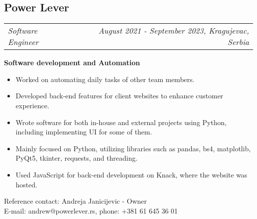\documentclass[11pt,a4paper]{moderncv}
\newcommand*{\experienceentry}[5][1.5mm]{
    \subsection{#2} \vspace{-1.5mm}
    \begin{tabularx}{\textwidth}{LR}
        {\itshape #3} & {\itshape #4, #5}
    \end{tabularx}
    \par\addvspace{#1}
}
\begin{document}
\begin{minipage}[t]{0.62\textwidth}
    \vspace{1.0mm}
    
    \experienceentry{Power Lever}{Software Engineer}{August 2021 - September 2023}{Kragujevac, Serbia}

    \textbf{Software development and Automation}
    \begin{itemize}
        \item Worked on automating daily tasks of other team members.
        \item Developed back-end features for client websites to enhance customer experience.
        \item Wrote software for both in-house and external projects using Python, including implementing UI for some of them.
        \item Mainly focused on Python, utilizing libraries such as pandas, bs4, matplotlib, PyQt5, tkinter, requests, and threading.
        \item Used JavaScript for back-end development on Knack, where the website was hosted.
    \end{itemize}
    Reference contact: Andreja Janicijevic - Owner\\
    E-mail: andrew@powerlever.rs, phone: +381 61 645 36 01

    \vspace{2.0mm}

\end{minipage}
\hfill
\end{document}
